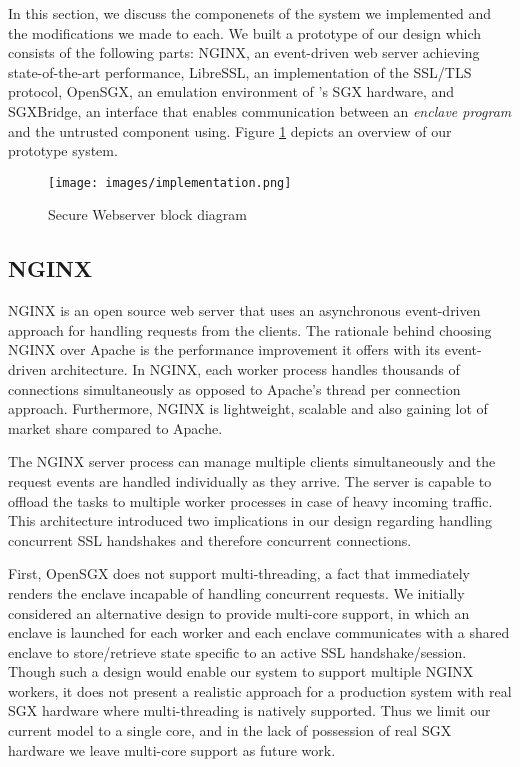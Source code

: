 \documentclass[../main.tex]{subfiles}
\begin{document}
In this section, we discuss the componenets of the system we
implemented and the modifications we made to each. We built a
prototype of our design which consists of the following parts: NGINX,
an event-driven web server achieving state-of-the-art performance,
LibreSSL, an implementation of the SSL/TLS protocol, OpenSGX, an
emulation environment of \Intel's SGX hardware, and SGXBridge, an
interface that enables communication between an \textit{enclave
  program} and the untrusted component using. Figure
\ref{fig:implementation-overview} depicts an overview of our prototype
system.

\begin{figure}[H]
  \centering
  \texttt{[image: images/implementation.png]}
  \caption{Secure Webserver block diagram }
  \label{fig:implementation-overview}
\end{figure}

\subsection{NGINX}

NGINX is an open source web server that uses an asynchronous
event-driven approach for handling requests from the clients. The
rationale behind choosing NGINX over Apache is the performance
improvement it offers with its event-driven architecture. In NGINX,
each worker process handles thousands of connections simultaneously as
opposed to Apache's thread per connection approach. Furthermore, NGINX
is lightweight, scalable and also gaining lot of market share compared
to Apache.

The NGINX server process can manage multiple clients simultaneously
and the request events are handled individually as they arrive. The
server is capable to offload the tasks to multiple worker processes in
case of heavy incoming traffic. This architecture introduced two
implications in our design regarding handling concurrent SSL
handshakes and therefore concurrent connections.

First, OpenSGX does not support multi-threading, a fact that
immediately renders the enclave incapable of handling concurrent
requests. We initially considered an alternative design to provide
multi-core support, in which an enclave is launched for each worker
and each enclave communicates with a shared enclave to store/retrieve
state specific to an active SSL handshake/session. Though such a
design would enable our system to support multiple NGINX workers, it
does not present a realistic approach for a production system with
real SGX hardware where multi-threading is natively supported. Thus we
limit our current model to a single core, and in the lack of
possession of real SGX hardware we leave multi-core support as future
work.
\end{document}
